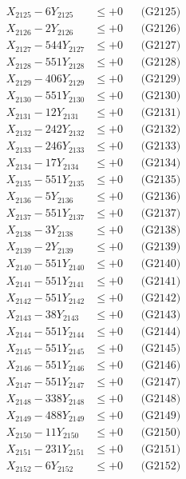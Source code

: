 \documentclass[a4paper,10pt]{article}
\begin{document}
{\begin{align}
X_{2125} - 6Y_{2125} &\leq +0 && \text{(G2125)} \\
X_{2126} - 2Y_{2126} &\leq +0 && \text{(G2126)} \\
X_{2127} - 544Y_{2127} &\leq +0 && \text{(G2127)} \\
X_{2128} - 551Y_{2128} &\leq +0 && \text{(G2128)} \\
X_{2129} - 406Y_{2129} &\leq +0 && \text{(G2129)} \\
X_{2130} - 551Y_{2130} &\leq +0 && \text{(G2130)} \\
\allowbreak
X_{2131} - 12Y_{2131} &\leq +0 && \text{(G2131)} \\
X_{2132} - 242Y_{2132} &\leq +0 && \text{(G2132)} \\
X_{2133} - 246Y_{2133} &\leq +0 && \text{(G2133)} \\
X_{2134} - 17Y_{2134} &\leq +0 && \text{(G2134)} \\
X_{2135} - 551Y_{2135} &\leq +0 && \text{(G2135)} \\
X_{2136} - 5Y_{2136} &\leq +0 && \text{(G2136)} \\
X_{2137} - 551Y_{2137} &\leq +0 && \text{(G2137)} \\
X_{2138} - 3Y_{2138} &\leq +0 && \text{(G2138)} \\
X_{2139} - 2Y_{2139} &\leq +0 && \text{(G2139)} \\
X_{2140} - 551Y_{2140} &\leq +0 && \text{(G2140)} \\
\allowbreak
X_{2141} - 551Y_{2141} &\leq +0 && \text{(G2141)} \\
X_{2142} - 551Y_{2142} &\leq +0 && \text{(G2142)} \\
X_{2143} - 38Y_{2143} &\leq +0 && \text{(G2143)} \\
X_{2144} - 551Y_{2144} &\leq +0 && \text{(G2144)} \\
X_{2145} - 551Y_{2145} &\leq +0 && \text{(G2145)} \\
X_{2146} - 551Y_{2146} &\leq +0 && \text{(G2146)} \\
X_{2147} - 551Y_{2147} &\leq +0 && \text{(G2147)} \\
X_{2148} - 338Y_{2148} &\leq +0 && \text{(G2148)} \\
X_{2149} - 488Y_{2149} &\leq +0 && \text{(G2149)} \\
X_{2150} - 11Y_{2150} &\leq +0 && \text{(G2150)} \\
\allowbreak
X_{2151} - 231Y_{2151} &\leq +0 && \text{(G2151)} \\
X_{2152} - 6Y_{2152} &\leq +0 && \text{(G2152)} \\

\end{align}}
\end{document}
